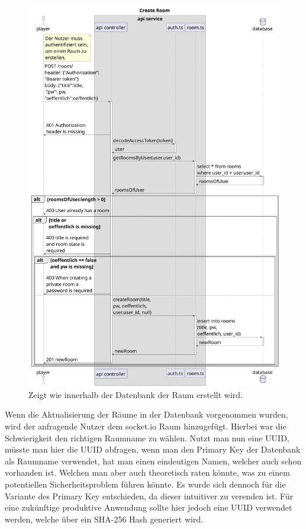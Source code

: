 \documentclass[
]{article}
\begin{document}
\begin{figure}[H]
	\centering
	\includegraphics[width=\textwidth ]{resources/create_room.pdf}
	\caption{Zeigt wie innerhalb der Datenbank der Raum erstellt wird.}
	\label{fig:ablaufdiagramm-create_room}
\end{figure}

Wenn die Aktualisierung der Räume in der Datenbank vorgenommen wurden, wird der anfragende Nutzer dem socket.io Raum hinzugefügt.
Hierbei war die Schwierigkeit den richtigen Raumname zu wählen.
Nutzt man nun eine UUID, müsste man hier die UUID abfragen, wenn man den Primary Key der Datenbank als Raumname verwendet,
hat man einen eindeutigen Namen, welcher auch schon vorhanden ist. 
Welchen man aber auch theoretisch raten könnte, was zu einem potentiellen Sicherheitsproblem führen könnte.
Es wurde sich dennoch für die Variante des Primary Key entschieden, 
da dieser intuitiver zu verenden ist. Für eine zukünftige produktive Anwendung sollte hier jedoch eine UUID 
verwendet werden, welche über ein SHA-256 Hash generiert wird.
\end{document}
